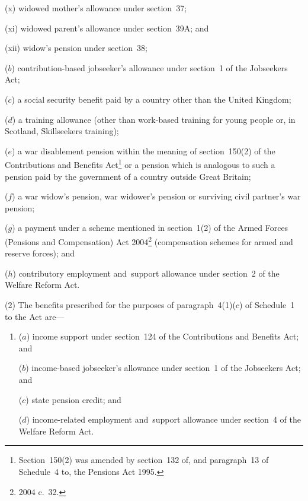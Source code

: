 \documentclass[12pt,a4paper]{article}
\begin{document}
\begin{enumerate}
\begin{enumerate}
(x) widowed mother’s allowance under section~37;

(xi) widowed parent’s allowance under section~39A; and

(xii) widow’s pension under section~38;
\end{enumerate}

($b$) contribution-based jobseeker’s allowance under section~1 of the Jobseekers Act;

($c$) a social security benefit paid by a country other than the United Kingdom;

($d$) a training allowance (other than work-based training for young people or, in Scotland, Skillseekers training); 

($e$) a war disablement pension 
within the meaning of section~150(2) of the Contributions and Benefits Act\footnote{Section~150(2) was amended by section~132 of, and paragraph~13 of Schedule~4 to, the Pensions Act 1995.} or a pension which is analogous to such a pension paid by the government of a country outside Great Britain;


($f$) a war widow’s pension, war widower’s pension or surviving civil partner’s war pension;
%

($g$) a payment under a scheme mentioned in section~1(2) of the Armed Forces (Pensions and Compensation) Act 2004\footnote{2004 c.\ 32.} (compensation schemes for armed and reserve forces);
%
and

($h$) contributory employment and~support allowance under section~2 of the Welfare Reform Act.
\end{enumerate}

(2) The benefits prescribed for the purposes of paragraph~4(1)($c$)  of Schedule~1 to the Act are—
\begin{enumerate}\item[]
($a$) income support under section~124 of the Contributions and Benefits Act; and

($b$) income-based jobseeker’s allowance under section~1 of the Jobseekers Act;
%
and

    ($c$) 
    state pension credit;
%
and

($d$) income-related employment and~support allowance under section~4 of the Welfare Reform Act.
\end{enumerate}
\end{document}
